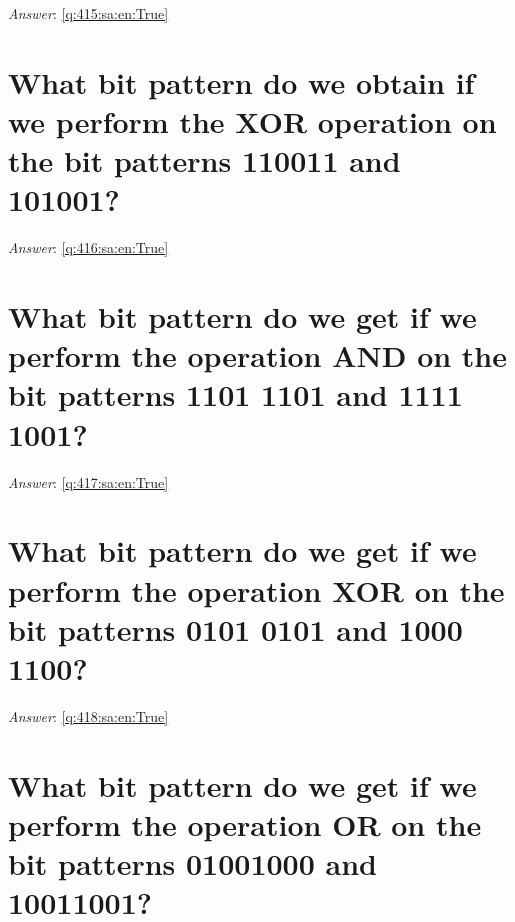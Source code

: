 \documentclass[a4paper,11pt,oneside]{book}
\begin{document}
\begin{sloppypar}
\textit{Answer}: \autoref{q:415:sa:en:True}



\section{What bit pattern do we obtain if we perform the XOR operation on the bit patterns 110011 and 101001?}

\label{q:416:sa:en:False}

\vspace{2cm}

\noindent\makebox[\textwidth]{\hrulefill}

\vspace{1cm}

\textit{Answer}: \autoref{q:416:sa:en:True}



\section{What bit pattern do we get if we perform the operation AND on the bit patterns 1101 1101 and 1111 1001?}

\label{q:417:sa:en:False}

\vspace{2cm}

\noindent\makebox[\textwidth]{\hrulefill}

\vspace{1cm}

\textit{Answer}: \autoref{q:417:sa:en:True}



\section{What bit pattern do we get if we perform the operation XOR on the bit patterns 0101 0101 and 1000 1100?}

\label{q:418:sa:en:False}

\vspace{2cm}

\noindent\makebox[\textwidth]{\hrulefill}

\vspace{1cm}

\textit{Answer}: \autoref{q:418:sa:en:True}



\section{What bit pattern do we get if we perform the operation OR on the bit patterns 01001000 and 10011001?}


\end{sloppypar}
\end{document}
